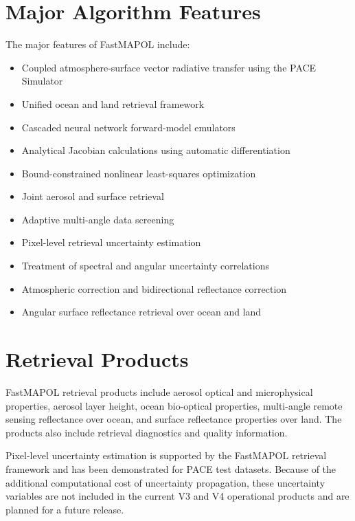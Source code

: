 \documentclass[
  11pt,
  letterpaper,
]{scrreprt}
\providecommand{\tightlist}{%
  \setlength{\itemsep}{0pt}\setlength{\parskip}{0pt}}
\begin{document}
\section{Major Algorithm Features}\label{major-algorithm-features}

The major features of FastMAPOL include:

\begin{itemize}
\tightlist
\item
  Coupled atmosphere-surface vector radiative transfer using the PACE
  Simulator
\item
  Unified ocean and land retrieval framework
\item
  Cascaded neural network forward-model emulators
\item
  Analytical Jacobian calculations using automatic differentiation
\item
  Bound-constrained nonlinear least-squares optimization
\item
  Joint aerosol and surface retrieval
\item
  Adaptive multi-angle data screening
\item
  Pixel-level retrieval uncertainty estimation
\item
  Treatment of spectral and angular uncertainty correlations
\item
  Atmospheric correction and bidirectional reflectance correction
\item
  Angular surface reflectance retrieval over ocean and land
\end{itemize}

\section{Retrieval Products}\label{retrieval-products}

FastMAPOL retrieval products include aerosol optical and microphysical
properties, aerosol layer height, ocean bio-optical properties,
multi-angle remote sensing reflectance over ocean, and surface
reflectance properties over land. The products also include retrieval
diagnostics and quality information.

Pixel-level uncertainty estimation is supported by the FastMAPOL
retrieval framework and has been demonstrated for PACE test datasets.
Because of the additional computational cost of uncertainty propagation,
these uncertainty variables are not included in the current V3 and V4
operational products and are planned for a future release.
\end{document}
